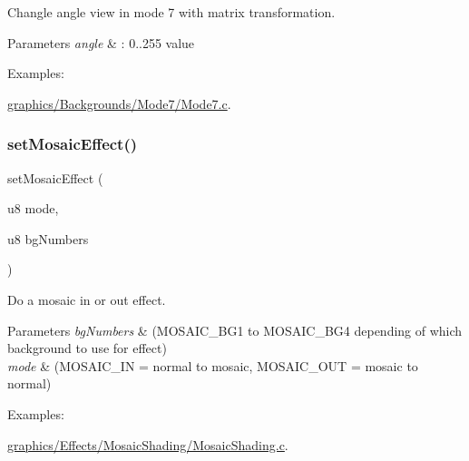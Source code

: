 Changle angle view in mode 7 with matrix transformation. 


\begin{DoxyParams}{Parameters}
{\em angle} & \+: 0..255 value \\
\hline
\end{DoxyParams}
\begin{Desc}
\item[Examples\+: ]\par
\hyperlink{a00417}{graphics/\+Backgrounds/\+Mode7/\+Mode7.\+c}.\end{Desc}
\mbox{\label{a00368_aa14785c4eb1ce08cc02eb98d26c98c44}} 
\subsubsection{\texorpdfstring{set\+Mosaic\+Effect()}{setMosaicEffect()}}
{\footnotesize\ttfamily set\+Mosaic\+Effect (\begin{DoxyParamCaption}\item[{u8}]{mode,  }\item[{u8}]{bg\+Numbers }\end{DoxyParamCaption})}



Do a mosaic in or out effect. 


\begin{DoxyParams}{Parameters}
{\em bg\+Numbers} & (M\+O\+S\+A\+I\+C\+\_\+\+B\+G1 to M\+O\+S\+A\+I\+C\+\_\+\+B\+G4 depending of which background to use for effect) \\
\hline
{\em mode} & (M\+O\+S\+A\+I\+C\+\_\+\+IN = normal to mosaic, M\+O\+S\+A\+I\+C\+\_\+\+O\+UT = mosaic to normal) \\
\hline
\end{DoxyParams}
\begin{Desc}
\item[Examples\+: ]\par
\hyperlink{a00421}{graphics/\+Effects/\+Mosaic\+Shading/\+Mosaic\+Shading.\+c}.\end{Desc}
